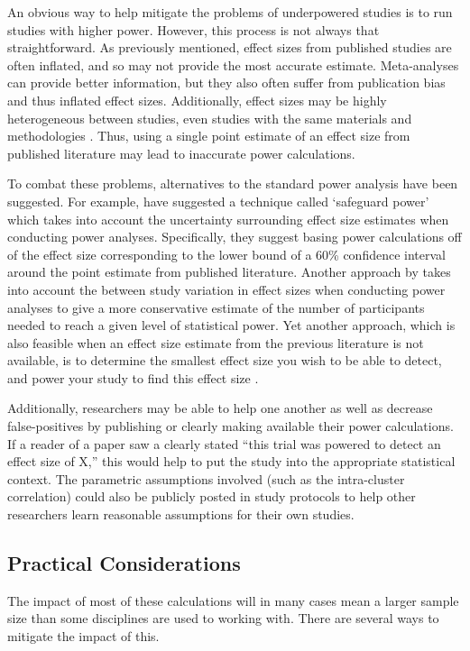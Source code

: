 \documentclass[12pt] {article}
\begin{document}
An obvious way to help mitigate the problems of underpowered studies is to run studies with higher power. However, this 
process is not always that straightforward. As previously mentioned, effect sizes from published studies are often inflated, 
and so may not provide the most accurate estimate. Meta-analyses can provide better information, but they also often suffer 
from publication bias and thus inflated effect sizes. Additionally, effect sizes may be highly heterogeneous between studies, 
even studies with the same materials and methodologies \citep{many_labs}. Thus, using a single point estimate of an effect size 
from published literature may lead to inaccurate power calculations.

To combat these problems, alternatives to the standard power analysis have been suggested. For example, \cite{perugini2014safeguard} 
have suggested a technique called `safeguard power' which takes into account the uncertainty surrounding effect size estimates 
when conducting power analyses. Specifically, they suggest basing power calculations off of the effect size corresponding to the lower bound of a 60\% confidence interval around the point estimate from published literature. Another approach by \cite{mcshane_2014} takes into account the between study variation in effect sizes when conducting power analyses to give a more conservative estimate of the number of participants needed to reach a given level of statistical power. Yet another approach, which is also feasible when an effect size estimate from the previous literature is not available, is to determine the smallest effect size you wish to be able to detect, and power your study to find this effect size \citep{bloom1995minimum}.  

Additionally, researchers may be able to help one another as well as decrease false-positives by publishing or clearly making available their power calculations. If a reader of a paper saw a clearly stated ``this trial was powered to detect an effect size of X,'' this would help to put the study into the appropriate statistical context. The parametric assumptions involved (such as the intra-cluster correlation) could also be publicly posted in study protocols to help other researchers learn reasonable assumptions for their own studies. 
\subsection {Practical Considerations}
The impact of most of these calculations will in many cases mean a larger sample size than some disciplines are used to working with. There are several ways to mitigate the impact of this. 
\end{document}
